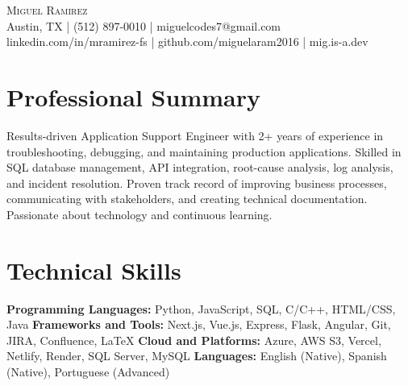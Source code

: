 \documentclass[letterpaper,10pt]{article}
\begin{document}
\begin{center}
  {\Large \scshape Miguel Ramirez} \\ \vspace{0pt}
  Austin, TX | (512) 897-0010 | miguelcodes7@gmail.com \\ 
  linkedin.com/in/mramirez-fs | github.com/miguelaram2016 | mig.is-a.dev
\end{center}

\section*{Professional Summary}
Results-driven Application Support Engineer with 2+ years of experience in troubleshooting, debugging, and maintaining production applications. Skilled in SQL database management, API integration, root-cause analysis, log analysis, and incident resolution. Proven track record of improving business processes, communicating with stakeholders, and creating technical documentation. Passionate about technology and continuous learning.

\section*{Technical Skills}
\textbf{Programming Languages:} Python, JavaScript, SQL, C/C++, HTML/CSS, Java \newline
\textbf{Frameworks and Tools:} Next.js, Vue.js, Express, Flask, Angular, Git, JIRA, Confluence, LaTeX \newline
\textbf{Cloud and Platforms:} Azure, AWS S3, Vercel, Netlify, Render, SQL Server, MySQL \newline
\textbf{Languages:} English (Native), Spanish (Native), Portuguese (Advanced)

\end{document}
